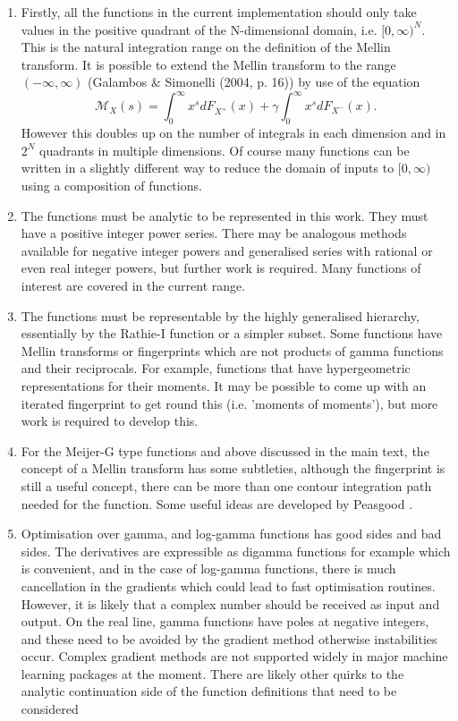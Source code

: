\documentclass{article}
\begin{document}
\begin{enumerate}
\item  Firstly, all the functions in the current implementation should only take values in the positive quadrant of the N-dimensional domain, i.e. $[0,\infty)^N$. This is the natural integration range on the definition of the Mellin transform. It is possible to extend the Mellin transform to the range $(-\infty,\infty)$ (Galambos \& Simonelli (2004, p. 16)) by use of the equation  $$\mathcal{M}_X(s) = \int_0^\infty  x^s dF_{X^+}(x) + \gamma\int_0^\infty x^s dF_{X^-}(x).$$ However this doubles up on the number of integrals in each dimension and in $2^N$ quadrants in multiple dimensions. Of course many functions can be written in a slightly different way to reduce the domain of inputs to $[0,\infty)$ using a composition of functions.
\item The functions must be analytic to be represented in this work. They must have a positive integer power series. There may be analogous methods available for negative integer powers and generalised series with rational or even real integer powers, but further work is required. Many functions of interest are covered in the current range.
\item The functions must be representable by the highly generalised hierarchy, essentially by the Rathie-I function or a simpler subset. Some functions have Mellin transforms or fingerprints which are not products of gamma functions and their reciprocals. For example, functions that have hypergeometric representations for their moments. It may be possible to come up with an iterated fingerprint to get round this (i.e. 'moments of moments'), but more work is required to develop this.
\item For the Meijer-G type functions and above discussed in the main text, the concept of a Mellin transform has some subtleties, although the fingerprint is still a useful concept, there can be more than one contour integration path needed for the function. Some useful ideas are developed by Peasgood \cite{Peasgood2009}.
\item Optimisation over gamma, and log-gamma functions has good sides and bad sides. The derivatives are expressible as digamma functions for example which is convenient, and in the case of log-gamma functions, there is much cancellation in the gradients which could lead to fast optimisation routines. However, it is likely that a complex number should be received as input and output. On the real line, gamma functions have poles at negative integers, and these need to be avoided by the gradient method otherwise instabilities occur. Complex gradient methods are not supported widely in major machine learning packages at the moment. There are likely other quirks to the analytic continuation side of the function definitions that need to be considered

\end{enumerate}
\end{document}
